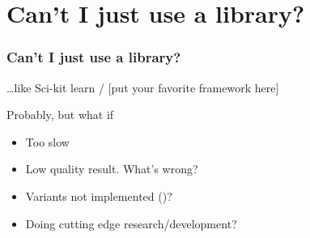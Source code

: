 \documentclass[10pt]{beamer}
\begin{document}
\section{Can’t I just use a library?}
\begin{frame}
  \frametitle{Can't I just use a library?}
  \ldots like Sci-kit learn / [put your favorite framework here]

  Probably, but what if
  \begin{itemize}
    \item <2-> Too slow
    \item <3-> Low quality result. What’s wrong?
    \item <4-> Variants not implemented (\Sadey)?
    \item <5-> Doing cutting edge research/development?
  \end{itemize}
\end{frame}
\end{document}
